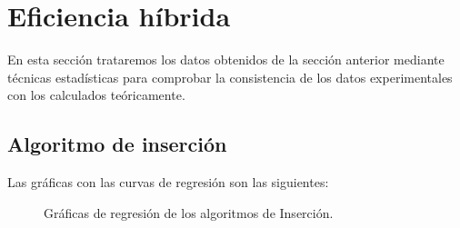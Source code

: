 \documentclass{homework}
\begin{document}
    \section{Eficiencia híbrida}
    
    En esta sección trataremos los datos obtenidos de la sección anterior mediante técnicas estadísticas para
    comprobar la consistencia de los datos experimentales con los calculados teóricamente. 

    \subsection{Algoritmo de inserción}

    Las gráficas con las curvas de regresión son las siguientes:

    \begin{figure}[H]
        \centering


        \caption{Gráficas de regresión de los algoritmos de Inserción.}

        \label{hib:insercion}
    \end{figure}
\end{document}
